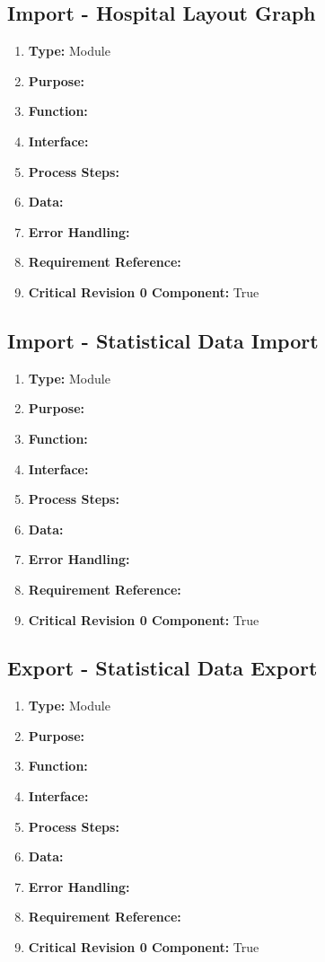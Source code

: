 \documentclass[paper=letter, fontsize=10pt]{scrartcl}
\numberwithin{equation}{section}		%
\numberwithin{figure}{section}			%
\numberwithin{table}{section}				%
\begin{document}
\subsection{Import - Hospital Layout Graph}
\begin{enumerate}[]
	\item \textbf{Type:} Module
	\item \textbf{Purpose:} 
	\item \textbf{Function:} 
	\item \textbf{Interface:}
	\item \textbf{Process Steps:} 
	\item \textbf{Data:}
	\item \textbf{Error Handling:}
	\item \textbf{Requirement Reference:}
	\item \textbf{Critical Revision 0 Component:} True
\end{enumerate}
\subsection{Import - Statistical Data Import}
\begin{enumerate}[]
	\item \textbf{Type:} Module
	\item \textbf{Purpose:} 
	\item \textbf{Function:} 
	\item \textbf{Interface:}
	\item \textbf{Process Steps:} 
	\item \textbf{Data:}
	\item \textbf{Error Handling:}
	\item \textbf{Requirement Reference:}
	\item \textbf{Critical Revision 0 Component:} True
\end{enumerate}
\subsection{Export - Statistical Data Export}
\begin{enumerate}[]
	\item \textbf{Type:} Module
	\item \textbf{Purpose:} 
	\item \textbf{Function:} 
	\item \textbf{Interface:}
	\item \textbf{Process Steps:} 
	\item \textbf{Data:}
	\item \textbf{Error Handling:}
	\item \textbf{Requirement Reference:}
	\item \textbf{Critical Revision 0 Component:} True
\end{enumerate}
\end{document}
